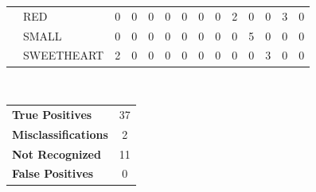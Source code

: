 \documentclass[12pt]{article}
\begin{document}
\begin{table}[h]
\begin{tabular}{ll|c|c|c|c|c|c|c|c|c|c|c|c|}
\multicolumn{1}{|l}{}          & \multicolumn{1}{|l|}{RED}        & 0   & 0   & 0         & 0     & 0    & 0      & 0     & 2   & 0     & 0          & 3              & 0              \\ \cline{2-14} 
\multicolumn{1}{|l}{}          & \multicolumn{1}{|l|}{SMALL}      & 0   & 0   & 0         & 0     & 0    & 0      & 0     & 0   & 5     & 0          & 0              & 0              \\ \cline{2-14} 
\multicolumn{1}{|l}{}          & \multicolumn{1}{|l|}{SWEETHEART} & 2   & 0   & 0         & 0     & 0    & 0      & 0     & 0   & 0     & 3          & 0              & 0              \\ \hline
\end{tabular}
\\
\begin{tabular}{l c}

\textbf{True Positives} & 37 \\
\textbf{Misclassifications} & 2 \\
\textbf{Not Recognized} & 11 \\
\textbf{False Positives} & 0 \\

\end{tabular}
\end{table}
\end{document}
